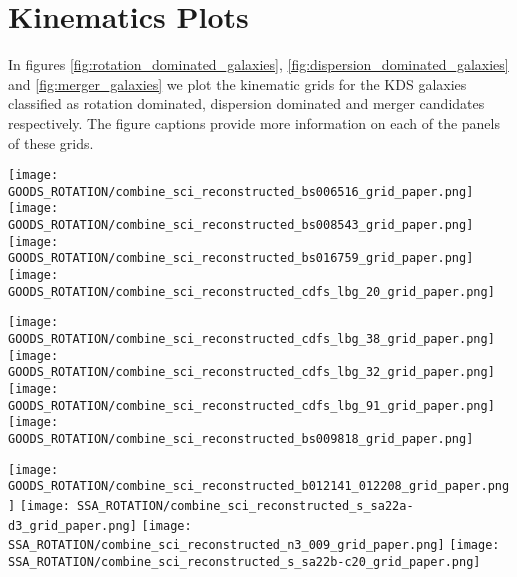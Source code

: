 \documentclass[fleqn,usenatbib]{mn2e}
\begin{document}
\appendix

\section{Kinematics Plots}\label{app:kinematics_plots}
In figures \ref{fig:rotation_dominated_galaxies}, \ref{fig:dispersion_dominated_galaxies} and \ref{fig:merger_galaxies} we plot the kinematic grids for the KDS galaxies classified as rotation dominated, dispersion dominated and merger candidates respectively.
The figure captions provide more information on each of the panels of these grids.

\begin{figure*}
    \centering

    \texttt{[image: GOODS\_ROTATION/combine\_sci\_reconstructed\_bs006516\_grid\_paper.png]}
    \texttt{[image: GOODS\_ROTATION/combine\_sci\_reconstructed\_bs008543\_grid\_paper.png]}
    \texttt{[image: GOODS\_ROTATION/combine\_sci\_reconstructed\_bs016759\_grid\_paper.png]}
    \texttt{[image: GOODS\_ROTATION/combine\_sci\_reconstructed\_cdfs\_lbg\_20\_grid\_paper.png]}


\end{figure*}

\begin{figure*}\ContinuedFloat
    \centering

    \texttt{[image: GOODS\_ROTATION/combine\_sci\_reconstructed\_cdfs\_lbg\_38\_grid\_paper.png]}
    \texttt{[image: GOODS\_ROTATION/combine\_sci\_reconstructed\_cdfs\_lbg\_32\_grid\_paper.png]}
    \texttt{[image: GOODS\_ROTATION/combine\_sci\_reconstructed\_cdfs\_lbg\_91\_grid\_paper.png]}
    \texttt{[image: GOODS\_ROTATION/combine\_sci\_reconstructed\_bs009818\_grid\_paper.png]}


\end{figure*}


\begin{figure*}\ContinuedFloat
    \centering

    \texttt{[image: GOODS\_ROTATION/combine\_sci\_reconstructed\_b012141\_012208\_grid\_paper.png]}
    \texttt{[image: SSA\_ROTATION/combine\_sci\_reconstructed\_s\_sa22a-d3\_grid\_paper.png]}
    \texttt{[image: SSA\_ROTATION/combine\_sci\_reconstructed\_n3\_009\_grid\_paper.png]}
    \texttt{[image: SSA\_ROTATION/combine\_sci\_reconstructed\_s\_sa22b-c20\_grid\_paper.png]}


\end{figure*}
\end{document}
